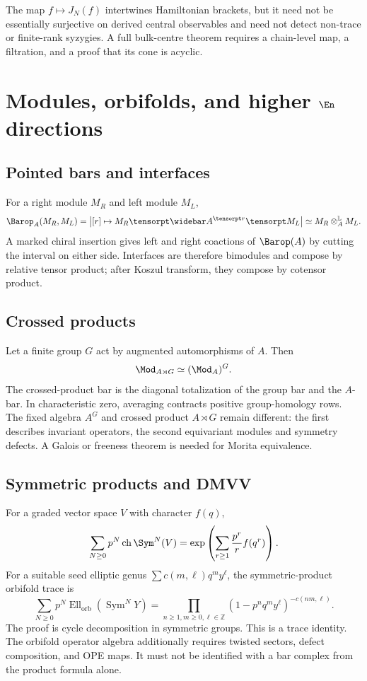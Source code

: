 \begin{nogobox}[title={No-go theorem 17: a trace-sector map is not the full open--closed equivalence}]
The map \(f\mapsto J_N(f)\) intertwines Hamiltonian brackets, but it need not be essentially surjective on derived central observables and need not detect non-trace or finite-rank syzygies.  A full bulk-centre theorem requires a chain-level map, a filtration, and a proof that its cone is acyclic.
\end{nogobox}

\chapter{Modules, orbifolds, and higher \(\En\) directions}

\section{Pointed bars and interfaces}
For a right module \(M_R\) and left module \(M_L\),
\[
 \Barop_A(M_R,M_L)=
 \bigl|[r]\mapsto M_R\tensorpt\widebar A^{\tensorpt r}\tensorpt M_L\bigr|
 \simeq M_R\otimes_A^{\mathbb L}M_L.
\]
A marked chiral insertion gives left and right coactions of \(\Barop(A)\) by cutting the interval on either side.  Interfaces are therefore bimodules and compose by relative tensor product; after Koszul transform, they compose by cotensor product.

\section{Crossed products}
Let a finite group \(G\) act by augmented automorphisms of \(A\).  Then
\[
 \Mod_{A\rtimes G}\simeq(\Mod_A)^G.
\]
The crossed-product bar is the diagonal totalization of the group bar and the \(A\)-bar.  In characteristic zero, averaging contracts positive group-homology rows.  The fixed algebra \(A^G\) and crossed product \(A\rtimes G\) remain different: the first describes invariant operators, the second equivariant modules and symmetry defects.  A Galois or freeness theorem is needed for Morita equivalence.

\section{Symmetric products and DMVV}
For a graded vector space \(V\) with character \(f(q)\),
\[
 \sum_{N\ge0}p^N\operatorname{ch}\Sym^N(V)
 =\exp\left(\sum_{r\ge1}\frac{p^r}{r}f(q^r)\right).
\]
For a suitable seed elliptic genus \(\sum c(m,\ell)q^my^\ell\), the symmetric-product orbifold trace is
\[
 \sum_{N\ge0}p^N\operatorname{Ell}_{\mathrm{orb}}(\operatorname{Sym}^NY)
 =\prod_{n\ge1,m\ge0,\ell\in\mathbb Z}
 (1-p^nq^my^\ell)^{-c(nm,\ell)}.
\]
The proof is cycle decomposition in symmetric groups.  This is a trace identity.  The orbifold operator algebra additionally requires twisted sectors, defect composition, and OPE maps.  It must not be identified with a bar complex from the product formula alone.

